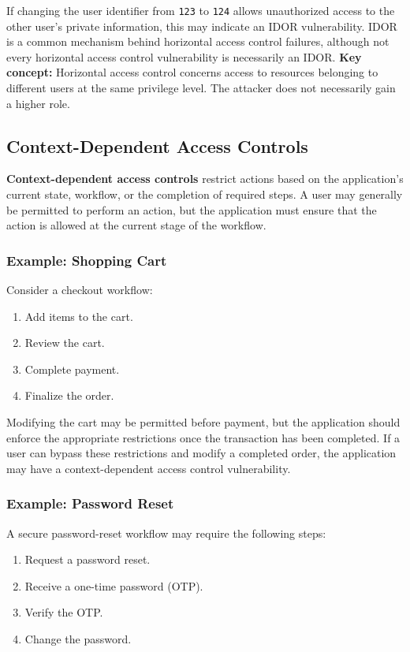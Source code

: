 \documentclass[11pt,a4paper]{article}
\begin{document}
If changing the user identifier from \texttt{123} to \texttt{124} allows unauthorized access to the other user's private information, this may indicate an IDOR vulnerability.
IDOR is a common mechanism behind horizontal access control failures, although not every horizontal access control vulnerability is necessarily an IDOR.
\textbf{Key concept:} Horizontal access control concerns access to resources belonging to different users at the same privilege level. The attacker does not necessarily gain a higher role.

\subsection{Context-Dependent Access Controls}

\textbf{Context-dependent access controls} restrict actions based on the application's current state, workflow, or the completion of required steps.
A user may generally be permitted to perform an action, but the application must ensure that the action is allowed at the current stage of the workflow.

\subsubsection{Example: Shopping Cart}

Consider a checkout workflow:
\begin{enumerate}
    \item Add items to the cart.
    \item Review the cart.
    \item Complete payment.
    \item Finalize the order.
\end{enumerate}

Modifying the cart may be permitted before payment, but the application should enforce the appropriate restrictions once the transaction has been completed.
If a user can bypass these restrictions and modify a completed order, the application may have a context-dependent access control vulnerability.

\subsubsection{Example: Password Reset}

A secure password-reset workflow may require the following steps:
\begin{enumerate}
    \item Request a password reset.
    \item Receive a one-time password (OTP).
    \item Verify the OTP.
    \item Change the password.
\end{enumerate}
\end{document}
